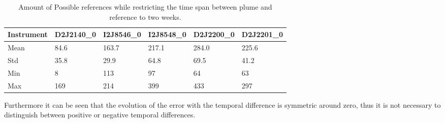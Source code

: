 \documentclass  [
  paper    = a4,
  BCOR     = 10mm,
  twoside,
  fontsize = 12pt,
  fleqn,
  toc      = bibnumbered,
  toc      = listofnumbered,
  numbers  = noendperiod,
  headings = normal,
  listof   = leveldown,
  version  = 3.03
]                                       {scrreprt}
\begin{document}
	\begin{table}[h]
		\begin{tabular}{|p{2cm}|p{2cm}|p{2cm}|p{2cm}|p{2cm}|p{2cm}|}
			Instrument	&D2J2140\_0&I2J8546\_0& I2J8548\_0&D2J2200\_0&D2J2201\_0\\
			\toprule
			Mean&84.6&163.7 &217.1&284.0&225.6\\
			\midrule
			Std&
			35.8&
			29.9&
			64.8&
			69.5&
			41.2\\
			\midrule
			Min&8&113&97&64 &63\\
			\midrule
			Max&169&214&399&433 &297 \\
			\bottomrule
		\end{tabular}
	\caption{Amount of Possible references while restricting the time span between plume and reference to two weeks.}
	\label{Tab:refstime}
	\end{table}	

	Furthermore it can be seen that the evolution of the   error with the temporal difference is symmetric around zero, thus it is not necessary to distinguish between positive or negative temporal differences.
\end{document}
